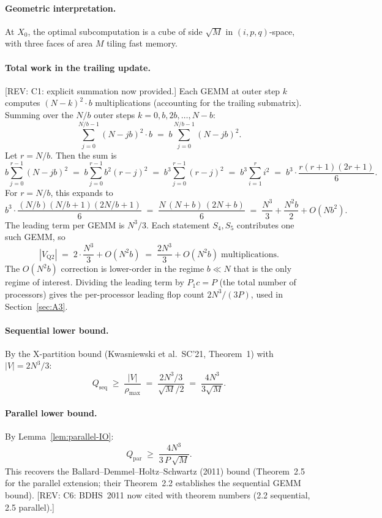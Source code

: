 \documentclass[11pt]{article}
\newcommand{\REV}[1]{\textcolor{blue!60!black}{\small\textsf{[REV: #1]}}}
\begin{document}
\paragraph{Geometric interpretation.}
At $X_0$, the optimal subcomputation is a cube of side $\sqrt{M}$ in
$(i,p,q)$-space, with three faces of area $M$ tiling fast memory.

\paragraph{Total work in the trailing update.}
\REV{C1: explicit summation now provided.}
Each GEMM at outer step $k$ computes $(N-k)^2 \cdot b$ multiplications
(accounting for the trailing submatrix). Summing over the $N/b$ outer
steps $k = 0, b, 2b, \ldots, N-b$:
\[
  \sum_{j=0}^{N/b - 1} (N - jb)^2 \cdot b
  \;=\; b \sum_{j=0}^{N/b-1} (N - jb)^2.
\]
Let $r = N/b$. Then the sum is
\[
  b \sum_{j=0}^{r-1} (N - jb)^2
  \;=\; b \sum_{j=0}^{r-1} b^2 (r - j)^2
  \;=\; b^3 \sum_{j=0}^{r-1} (r - j)^2
  \;=\; b^3 \sum_{i=1}^{r} i^2
  \;=\; b^3 \cdot \frac{r(r+1)(2r+1)}{6}.
\]
For $r = N/b$, this expands to
\[
  b^3 \cdot \frac{(N/b)(N/b+1)(2N/b+1)}{6}
  \;=\; \frac{N \,(N+b)\,(2N+b)}{6}
  \;=\; \frac{N^3}{3} + \frac{N^2 b}{2} + O(N b^2).
\]
The leading term per GEMM is $N^3/3$. Each statement $S_4, S_5$
contributes one such GEMM, so
\[
  \boxed{\;|V_{\mathrm{Q2}}| \;=\; 2 \cdot \frac{N^3}{3} + O(N^2 b)
  \;=\; \frac{2N^3}{3} + O(N^2 b)\;\text{multiplications}.\;}
\]
The $O(N^2 b)$ correction is lower-order in the regime
$b \ll N$ that is the only regime of interest. Dividing the leading
term by $P_1 c = P$ (the total number of processors) gives the
per-processor leading flop count $2N^3/(3P)$, used in
Section~\ref{sec:A3}.

\paragraph{Sequential lower bound.}
By the X-partition bound (Kwasniewski et al.\ SC'21, Theorem~1) with
$|V| = 2N^3/3$:
\[
  Q_{\mathrm{seq}} \;\ge\; \frac{|V|}{\rho_{\max}}
  \;=\; \frac{2N^3/3}{\sqrt{M}/2}
  \;=\; \frac{4 N^3}{3\sqrt{M}}.
\]

\paragraph{Parallel lower bound.}
By Lemma~\ref{lem:parallel-IO}:
\[
  \boxed{\;Q_{\mathrm{par}} \;\ge\; \frac{4 N^3}{3\,P\,\sqrt{M}}.\;}
\]
This recovers the Ballard--Demmel--Holtz--Schwartz (2011) bound
(Theorem~2.5 for the parallel extension; their Theorem~2.2 establishes
the sequential GEMM bound).
\REV{C6: BDHS~2011 now cited with theorem numbers (2.2 sequential, 2.5
parallel).}
\end{document}

